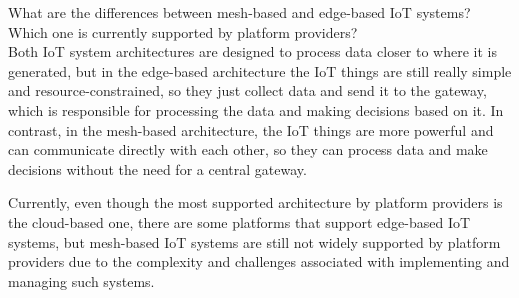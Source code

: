 \begin{ejercicio}
    What are the differences between mesh-based and edge-based IoT systems? Which one is currently supported by platform providers?\\

    Both IoT system architectures are designed to process data closer to where it is generated, but in the edge-based architecture the IoT things are still really simple and resource-constrained, so they just collect data and send it to the gateway, which is responsible for processing the data and making decisions based on it. In contrast, in the mesh-based architecture, the IoT things are more powerful and can communicate directly with each other, so they can process data and make decisions without the need for a central gateway.

    Currently, even though the most supported architecture by platform providers is the cloud-based one, there are some platforms that support edge-based IoT systems, but mesh-based IoT systems are still not widely supported by platform providers due to the complexity and challenges associated with implementing and managing such systems.
\end{ejercicio}